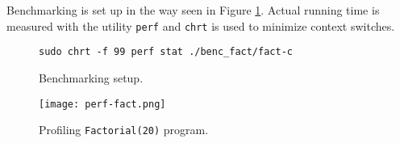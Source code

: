 Benchmarking is set up in the way seen in Figure \ref{bench-setup}. Actual running time is measured with the utility \texttt{perf} and \texttt{chrt} is used to minimize context switches.

\begin{figure}[h]
\begin{verbatim}
sudo chrt -f 99 perf stat ./benc_fact/fact-c 
\end{verbatim}
\caption{Benchmarking setup.}
\label{bench-setup}
\end{figure}


\begin{figure}[h]
\texttt{[image: perf-fact.png]}
\centering
\caption{Profiling \texttt{Factorial(20)} program.}
\label{perf-fact}
\end{figure}

